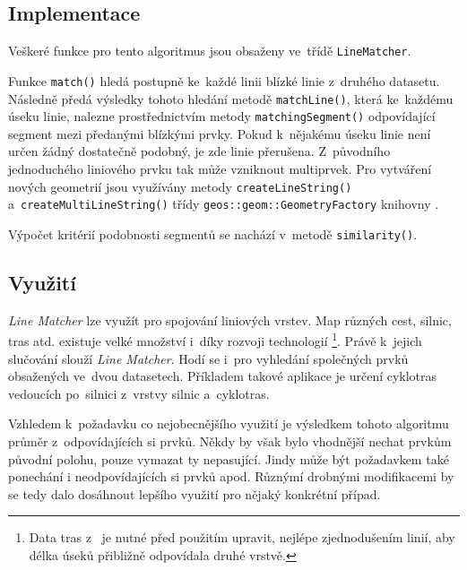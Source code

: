 \subsection{Implementace}
\label{lm-implementace}

Veškeré funkce pro tento algoritmus jsou obsaženy ve~třídě \texttt{Line\-Matcher}.

Funkce \texttt{match()} hledá postupně ke~každé linii blízké linie z~druhého datasetu.
Následně předá výsledky tohoto hledání metodě \texttt{match\-Line()}, která ke~každému
úseku linie, nalezne prostřednictvím metody \texttt{matching\-Segment()} odpovídající
segment mezi předanými blízkými prvky. Pokud k~nějakému úseku linie není určen
žádný dostatečně podobný, je zde linie přerušena. Z~původního jednoduchého liniového
prvku tak může vzniknout multiprvek. Pro vytváření nových geometrií jsou využívány
metody \texttt{createLineString()} a~\texttt{createMultiLineString()} třídy 
\texttt{geos::geom::GeometryFactory} knihovny .
 

Výpočet kritérií podobnosti segmentů se nachází v~metodě \texttt{similarity()}. 

\subsection{Využití}
\label{lm-vyuziti}

\textit{Line Matcher} lze využít pro spojování liniových vrstev. Map různých cest, 
silnic, tras atd. existuje velké množství i~díky rozvoji technologií 
\footnote{Data tras z~ je nutné před použitím upravit, nejlépe 
zjednodušením linií, aby délka úseků přibližně odpovídala druhé vrstvě.}. Právě
k~jejich slučování slouží \textit{Line Matcher}. Hodí se i~pro vyhledání 
společných prvků obsažených ve~dvou datasetech. Příkladem takové aplikace je 
určení cyklotras vedoucích po~silnici z~vrstvy silnic a~cyklotras.

Vzhledem k~požadavku co nejobecnějšího využití je výsledkem tohoto algoritmu
průměr z~odpovídajících si prvků.  Někdy by však bylo vhodnější nechat prvkům
původní polohu, pouze vymazat ty nepasující. Jindy může být požadavkem také
ponechání i neodpovídajících si prvků apod. Různýmí drobnými modifikacemi
by se tedy dalo dosáhnout lepšího využití pro nějaký konkrétní případ.
